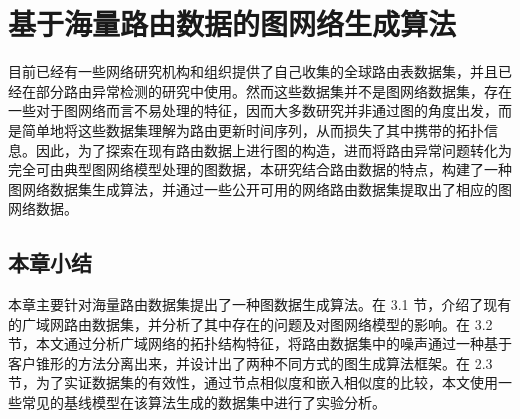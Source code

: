 
\chapter{基于海量路由数据的图网络生成算法}


目前已经有一些网络研究机构和组织提供了自己收集的全球路由表数据集，并且已经在部分路由异常检测的研究中使用。然而这些数据集并不是图网络数据集，存在一些对于图网络而言不易处理的特征，因而大多数研究并非通过图的角度出发，而是简单地将这些数据集理解为路由更新时间序列，从而损失了其中携带的拓扑信息。因此，为了探索在现有路由数据上进行图的构造，进而将路由异常问题转化为完全可由典型图网络模型处理的图数据，本研究结合路由数据的特点，构建了一种图网络数据集生成算法，并通过一些公开可用的网络路由数据集提取出了相应的图网络数据。







\section{本章小结}

本章主要针对海量路由数据集提出了一种图数据生成算法。在 3.1 节，介绍了现有的广域网路由数据集，并分析了其中存在的问题及对图网络模型的影响。在 3.2 节，本文通过分析广域网络的拓扑结构特征，将路由数据集中的噪声通过一种基于客户锥形的方法分离出来，并设计出了两种不同方式的图生成算法框架。在 2.3 节，为了实证数据集的有效性，通过节点相似度和嵌入相似度的比较，本文使用一些常见的基线模型在该算法生成的数据集中进行了实验分析。